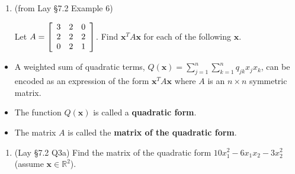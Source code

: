 \documentclass[12pt,letterpaper,noanswers]{exam}
\newcommand{\vc}[1]{\boldsymbol{#1}}
\begin{document}
\begin{enumerate}[resume=classQ]
    \item (from Lay \S 7.2 Example 6) 
    
    Let $A = \left[\begin{array}{c c c} 3 & 2 & 0 \\ 2 & 2 & 2 \\ 0 & 2 & 1 \end{array} \right]$. Find $\vc{x}^T A \vc{x}$ for each of the following $\vc{x}$.  
    
    
\end{enumerate}
\vfill

\begin{tcolorbox}
\begin{itemize}
\itemsep0pt
    \item A weighted sum of quadratic terms, $Q(\vc{x}) = \sum\limits_{j=1}^n\sum\limits_{k=1}^n q_{jk}x_jx_k$, can be encoded as an expression of the form $\vc{x}^TA\vc{x}$ where $A$ is an $n\times n $ symmetric matrix.
    \item The function $Q(\vc{x})$ is called a \textbf{quadratic form}.
    \item 
The matrix $A$ is called the \textbf{matrix of the quadratic form}.
\end{itemize}
\end{tcolorbox}

\begin{enumerate}[resume=classQ]
    \item (Lay \S 7.2 Q3a) 
    Find the matrix of the quadratic form $10x_1^2 - 6x_1x_2 - 3x_2^2$ (assume $\vc{x}\in\mathbb{R}^2$).
    
    
\vfill
\end{enumerate}
\end{document}
